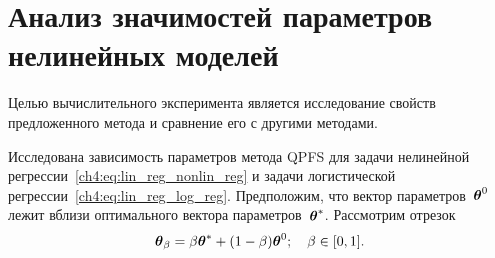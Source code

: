 \section{Анализ значимостей параметров нелинейных моделей}
\label{sec:ch4:newton_qpfs_exp}

Целью вычислительного эксперимента является исследование свойств предложенного метода и сравнение его с другими методами. 

Исследована зависимость параметров метода QPFS для задачи нелинейной регрессии~\eqref{ch4:eq:lin_reg_nonlin_reg} и задачи логистической регрессии~\eqref{ch4:eq:lin_reg_log_reg}. 
Предположим, что вектор параметров~$\boldsymbol{\theta}^0$ лежит вблизи оптимального вектора параметров~$\boldsymbol{\theta}^*$. 
Рассмотрим отрезок
\[
	\boldsymbol{\theta}_{\beta} = \beta \boldsymbol{\theta}^* + (1 - \beta) \boldsymbol{\theta}^0; \quad \beta \in [0, 1] .
\]

